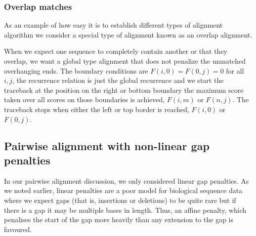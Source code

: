 \documentclass[11pt]{article}
\begin{document}
%
%

\subsubsection{Overlap matches}

As an example of how easy it is to establish different types of alignment algorithm we consider a special type of alignment known as an overlap alignment.  


When we expect one sequence to completely contain another or that they overlap, we want a global type alignment that does not penalize the unmatched overhanging ends. The boundary conditions are $F (i, 0) = F (0, j) = 0$ for all $i, j$, the recurrence relation is just the global recurrence and we start the traceback at the position on the right  or bottom boundary the maximum score taken over all scores on those boundaries is achieved, $F (i, m)$ or $F (n, j)$. The traceback stops when either the left or top border  is reached, $F (i, 0)$ or $F (0, j)$.


\subsection{Pairwise alignment with non-linear gap penalties }

In our pairwise alignment discussion, we only considered linear gap penalties.  As we noted earlier, linear penalties are a poor model for biological sequence data where we expect gaps (that is, insertions or deletions) to be quite rare but if there is a gap it may be multiple  bases in length.  Thus, an affine penalty, which penalises the start of the gap more heavily than any extension to the gap is favoured.
\end{document}
